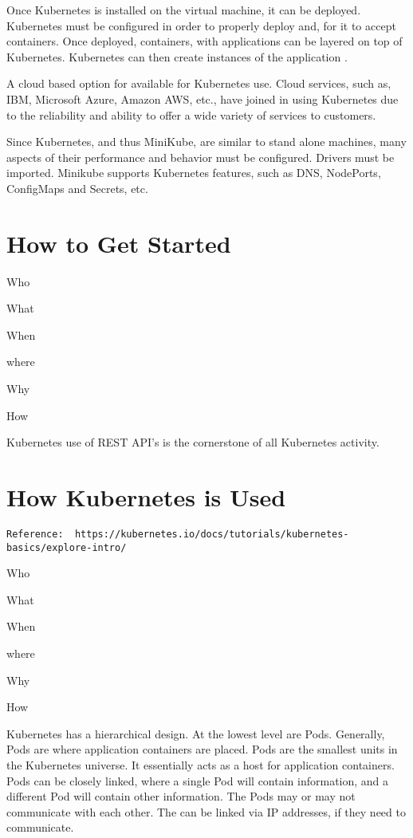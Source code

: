 Once Kubernetes is installed on the virtual machine, it can be
deployed.  Kubernetes must be configured in order to properly deploy
and, for it to accept containers.  Once deployed, containers, with
applications can be layered on top of Kubernetes.  Kubernetes can then
create instances of the application  \cite{hid-sp18-525-concept}.

A cloud based option for available for Kubernetes use.  Cloud
services, such as, IBM, Microsoft Azure, Amazon AWS, etc., have joined
in using Kubernetes due to the reliability and ability to offer a wide
variety of services to customers.   

Since Kubernetes, and thus MiniKube, are similar to stand alone
machines, many aspects of their performance and behavior must be
configured.  Drivers must be imported.  Minikube supports Kubernetes
features, such as DNS, NodePorts, ConfigMaps and Secrets, etc.   

\section{How to Get Started}

Who

What  

When

where

Why

How

Kubernetes use of REST API's is the cornerstone of all Kubernetes activity.  


\section{How Kubernetes is Used}


\verb|Reference:  https://kubernetes.io/docs/tutorials/kubernetes-basics/explore-intro/|

Who

What  

When

where

Why

How




Kubernetes has a hierarchical design.  At the lowest level are Pods.
Generally, Pods are where application containers are placed.  Pods are
the smallest units in the Kubernetes universe.  It essentially acts as
a host for application containers.  Pods can be closely linked, where
a single Pod will contain information, and a different Pod will
contain other information.  The Pods may or may not communicate with
each other.  The can be linked via IP addresses, if they need to
communicate.   


